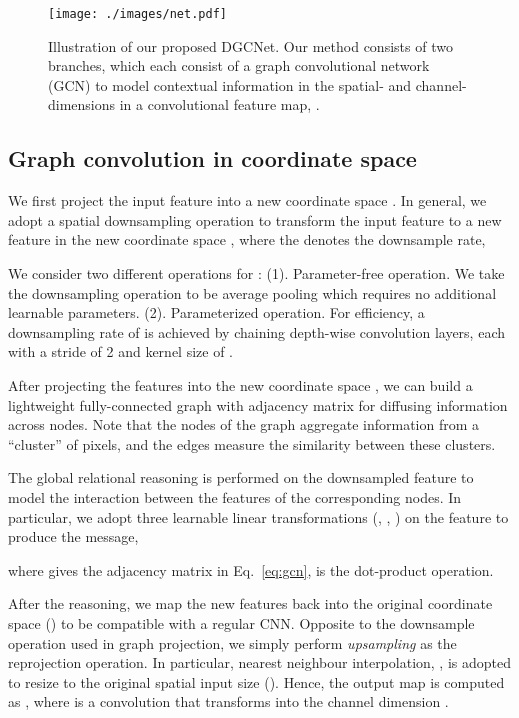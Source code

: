 \documentclass{bmvc2k}
\begin{document}
\begin{figure*}
\vspace{5mm}
	\centering
	\texttt{[image: ./images/net.pdf]}
	\vspace{-2mm}
	\caption{Illustration of our proposed DGCNet.
	        Our method consists of two branches, which each consist of a graph convolutional network (GCN) to model contextual information in the spatial- and channel-dimensions in a convolutional feature map, .
	}
	\label{fig:net}
\end{figure*}

\subsection{Graph convolution in coordinate space}
\label{sec:method_coordinate_space}
We first project the input feature into a new coordinate space .
In general, we adopt a spatial downsampling operation  to transform the input feature  to a new feature  in the new coordinate space , where the  denotes the downsample rate,


We consider two different operations for : 
(1). Parameter-free operation. We take the downsampling operation  to be average pooling which requires no additional learnable parameters.
(2). Parameterized operation. For efficiency, a downsampling rate of  is achieved by chaining  depth-wise convolution layers, each with a stride of 2 and kernel size of .

After projecting the features into the new coordinate space , we can build a lightweight fully-connected graph with adjacency matrix  for diffusing information across nodes.
Note that the nodes of the graph aggregate information from a ``cluster'' of pixels, and the edges measure the similarity between these clusters. 

The global relational reasoning is performed on the downsampled feature  to model the interaction between the features of the corresponding nodes.
In particular, we adopt three learnable linear transformations (, , ) on the feature  to produce the message, 

where  gives the adjacency matrix in Eq.~\ref{eq:gcn},   is the dot-product operation.

After the reasoning, we map the new features  back into the original coordinate space () to be compatible with a regular CNN. 
Opposite to the downsample operation  used in graph projection, we simply perform \emph{upsampling} as the reprojection operation. 
In particular,
nearest neighbour interpolation, , is adopted to resize  to the original spatial input size (). Hence, the output map is computed as , where  is a  convolution that transforms  into the channel dimension .
\end{document}
